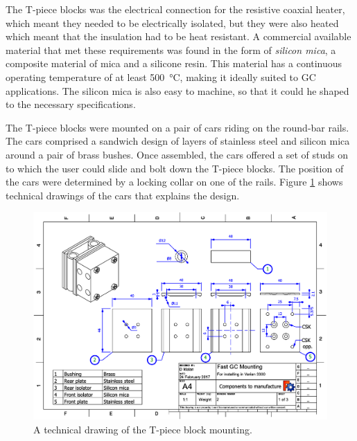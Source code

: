 The T-piece blocks was the electrical connection for the resistive coaxial heater,
which meant they needed to be electrically isolated, but they were also heated
which meant that the insulation had to be heat resistant. A commercial available
material that met these requirements was found in the form of \textit{silicon
mica}, a composite material of mica and a silicone resin. This material has a
continuous operating temperature of at least \SI{500}{\celsius}, making it
ideally suited to GC applications. The silicon mica is also easy to machine, so
that it could he shaped to the necessary specifications.

The T-piece blocks were mounted on a pair of cars riding on the round-bar rails.
The cars comprised a sandwich design of layers of stainless steel and silicon
mica around a pair of brass bushes. Once assembled, the cars offered a set of
studs on to which the user could slide and bolt down the T-piece blocks. The
position of the cars were determined by a locking collar on one of the rails.
Figure \ref{fig:CarsDrawing1} shows technical drawings of the cars that explains
the design.

\begin{figure}
	\centering
	\includegraphics[angle=90, origin=c, width=\textwidth]{Figures/CarDrawing1.pdf}
	\decoRule	
\caption[Technical drawing of coaxial heater mounting.]{A technical drawing of the T-piece block mounting.} 
	\label{fig:CarsDrawing1}
\end{figure}

